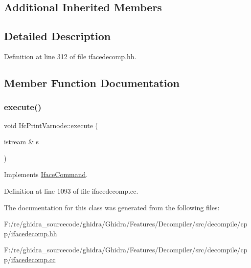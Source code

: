 \subsection*{Additional Inherited Members}


\subsection{Detailed Description}


Definition at line 312 of file ifacedecomp.\+hh.



\subsection{Member Function Documentation}
\mbox{\label{class_ifc_print_varnode_a45fb7ac3722eb334d0c28b5ee6b16d0e}} 
\subsubsection{\texorpdfstring{execute()}{execute()}}
{\footnotesize\ttfamily void Ifc\+Print\+Varnode\+::execute (\begin{DoxyParamCaption}\item[{istream \&}]{s }\end{DoxyParamCaption})\hspace{0.3cm}{\ttfamily [virtual]}}



Implements \mbox{\hyperlink{class_iface_command_af10e29cee2c8e419de6efe9e680ad201}{Iface\+Command}}.



Definition at line 1093 of file ifacedecomp.\+cc.



The documentation for this class was generated from the following files\+:\begin{DoxyCompactItemize}
\item 
F\+:/re/ghidra\+\_\+sourcecode/ghidra/\+Ghidra/\+Features/\+Decompiler/src/decompile/cpp/\mbox{\hyperlink{ifacedecomp_8hh}{ifacedecomp.\+hh}}\item 
F\+:/re/ghidra\+\_\+sourcecode/ghidra/\+Ghidra/\+Features/\+Decompiler/src/decompile/cpp/\mbox{\hyperlink{ifacedecomp_8cc}{ifacedecomp.\+cc}}\end{DoxyCompactItemize}
